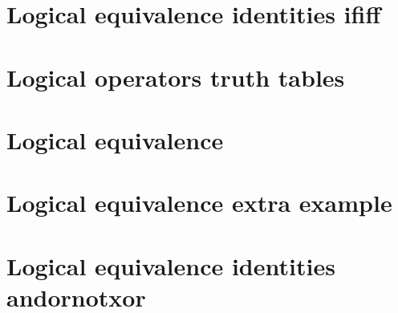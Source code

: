 
\section*{Logical equivalence identities ififf}

\vfill
\section*{Logical operators truth tables}

\vfill
\section*{Logical equivalence}

\vfill
\section*{Logical equivalence extra example}

\vfill
\section*{Logical equivalence identities andornotxor}

\vfill
